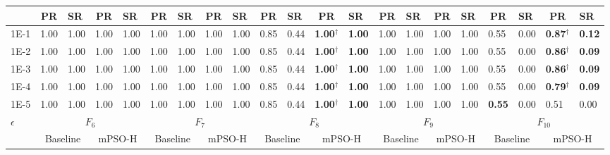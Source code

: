 \begin{table*}[h]
{\begin{tabular}{|p{4.8mm}|p{4.4mm}|p{4.4mm}|p{4.4mm}|p{4.4mm}|p{4.4mm}|p{4.4mm}|p{4.4mm}|p{4.4mm}|p{4.4mm}|p{4.4mm}|p{4.4mm}|p{4.4mm}|p{4.4mm}|p{4.4mm}|p{4.4mm}|p{4.4mm}|p{4.4mm}|p{4.4mm}|p{4.4mm}|p{4.4mm}|}
    \cline{2-21}
     & \multicolumn{1}{c|}{PR} & SR & \multicolumn{1}{c|}{PR} & SR & \multicolumn{1}{c|}{PR} & SR & \multicolumn{1}{c|}{PR} & SR & \multicolumn{1}{c|}{PR} & SR & \multicolumn{1}{c|}{PR} & SR & \multicolumn{1}{c|}{PR} & SR & \multicolumn{1}{c|}{PR} & SR & \multicolumn{1}{c|}{PR} & SR & \multicolumn{1}{c|}{PR} & SR \\
    \hline
    1E-1 & 1.00 & 1.00 & 1.00 & 1.00 & 1.00 & 1.00 & 1.00 & 1.00 & 0.85 & 0.44 & \textcolor{customblue}{\textbf{1.00$^\dagger$}} & \textcolor{customblue}{\textbf{1.00}} & 1.00 & 1.00 & 1.00 & 1.00 & 0.55 & 0.00 & \textcolor{customblue}{\textbf{0.87$^\dagger$}} & \textcolor{customblue}{\textbf{0.12}} \\
    1E-2 & 1.00 & 1.00 & 1.00 & 1.00 & 1.00 & 1.00 & 1.00 & 1.00 & 0.85 & 0.44 & \textcolor{customblue}{\textbf{1.00$^\dagger$}} & \textcolor{customblue}{\textbf{1.00}} & 1.00 & 1.00 & 1.00 & 1.00 & 0.55 & 0.00 & \textcolor{customblue}{\textbf{0.86$^\dagger$}} & \textcolor{customblue}{\textbf{0.09}} \\
    1E-3 & 1.00 & 1.00 & 1.00 & 1.00 & 1.00 & 1.00 & 1.00 & 1.00 & 0.85 & 0.44 & \textcolor{customblue}{\textbf{1.00$^\dagger$}} & \textcolor{customblue}{\textbf{1.00}} & 1.00 & 1.00 & 1.00 & 1.00 & 0.55 & 0.00 & \textcolor{customblue}{\textbf{0.86$^\dagger$}} & \textcolor{customblue}{\textbf{0.09}} \\
    1E-4 & 1.00 & 1.00 & 1.00 & 1.00 & 1.00 & 1.00 & 1.00 & 1.00 & 0.85 & 0.44 & \textcolor{customblue}{\textbf{1.00$^\dagger$}} & \textcolor{customblue}{\textbf{1.00}} & 1.00 & 1.00 & 1.00 & 1.00 & 0.55 & 0.00 & \textcolor{customblue}{\textbf{0.79$^\dagger$}} & \textcolor{customblue}{\textbf{0.09}} \\
    1E-5 & 1.00 & 1.00 & 1.00 & 1.00 & 1.00 & 1.00 & 1.00 & 1.00 & 0.85 & 0.44 & \textcolor{customblue}{\textbf{1.00$^\dagger$}} & \textcolor{customblue}{\textbf{1.00}} & 1.00 & 1.00 & 1.00 & 1.00 & \textcolor{customred}{\textbf{0.55}} & 0.00 & 0.51 & 0.00 \\
    \hline
    \multirow{3}{*}{$\epsilon$} & \multicolumn{4}{c|}{$F_{6}$} & \multicolumn{4}{c|}{$F_{7}$} & \multicolumn{4}{c|}{$F_{8}$} & \multicolumn{4}{c|}{$F_{9}$} & \multicolumn{4}{c|}{$F_{10}$} \\

    \cline{2-21}
    & \multicolumn{2}{c|}{Baseline} & \multicolumn{2}{c|}{mPSO-H} & \multicolumn{2}{c|}{Baseline} & \multicolumn{2}{c|}{mPSO-H} & \multicolumn{2}{c|}{Baseline} & \multicolumn{2}{c|}{mPSO-H} & \multicolumn{2}{c|}{Baseline} & \multicolumn{2}{c|}{mPSO-H} & \multicolumn{2}{c|}{Baseline} & \multicolumn{2}{c|}{mPSO-H} \\


\end{tabular}}
\end{table*}
